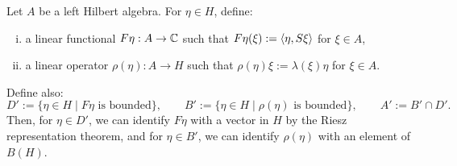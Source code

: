 \documentclass{../../../small}
\begin{document}
\begin{defn}
Let $A$ be a left Hilbert algebra.
For $\eta\in H$, define:
\begin{enumerate}[(i)]
\item a linear functional $F\eta:A\to\mathbb{C}$ such that $F\eta(\xi):=\langle\eta,S\xi\rangle$ for $\xi\in A$,
\item a linear operator $\rho(\eta):A\to H$ such that $\rho(\eta)\xi:=\lambda(\xi)\eta$ for $\xi\in A$.
\end{enumerate}
Define also:
\[D':=\{\eta\in H\mid F\eta\text{ is bounded}\},\qquad
B':=\{\eta\in H\mid \rho(\eta)\text{ is bounded}\},\qquad
A':=B'\cap D'.\]
Then, for $\eta\in D'$, we can identify $F\eta$ with a vector in $H$ by the Riesz representation theorem, and for $\eta\in B'$, we can identify $\rho(\eta)$ with an element of $B(H)$.
\end{defn}
\end{document}
